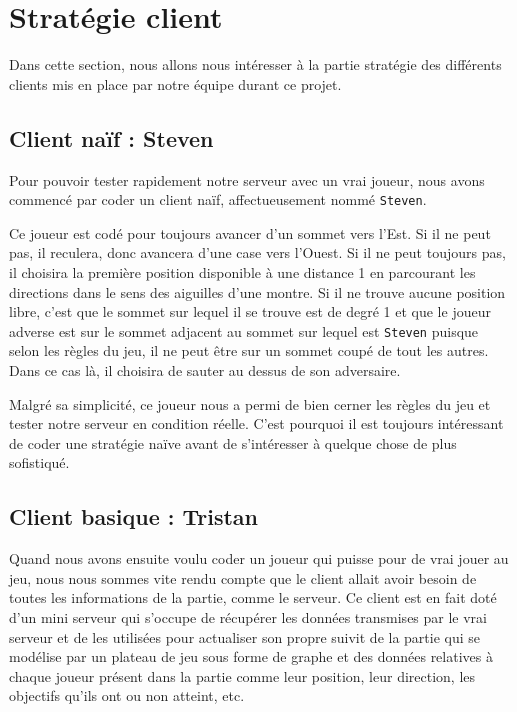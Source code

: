 \section{Stratégie client}

Dans cette section, nous allons nous intéresser à la partie stratégie des différents clients mis en place par notre équipe durant ce projet.

\subsection{Client naïf : Steven}

Pour pouvoir tester rapidement notre serveur avec un vrai joueur, nous avons commencé par coder un client naïf, affectueusement nommé \texttt{Steven}.
\bigskip

Ce joueur est codé pour toujours avancer d'un sommet vers l'Est. Si il ne peut pas, il reculera, donc avancera d'une case vers l'Ouest. Si il ne peut toujours pas, il choisira la première position disponible à une distance 1 en parcourant les directions dans le sens des aiguilles d'une montre. Si il ne trouve aucune position libre, c'est que le sommet sur lequel il se trouve est de degré 1 et que le joueur adverse est sur le sommet adjacent au sommet sur lequel est \texttt{Steven} puisque selon les règles du jeu, il ne peut être sur un sommet coupé de tout les autres. Dans ce cas là, il choisira de sauter au dessus de son adversaire.
\bigskip

Malgré sa simplicité, ce joueur nous a permi de bien cerner les règles du jeu et tester notre serveur en condition réelle. C'est pourquoi il est toujours intéressant de coder une stratégie naïve avant de s'intéresser à quelque chose de plus sofistiqué.

\subsection{Client basique : Tristan}

Quand nous avons ensuite voulu coder un joueur qui puisse pour de vrai jouer au jeu, nous nous sommes vite rendu compte que le client allait avoir besoin de toutes les informations de la partie, comme le serveur. Ce client est en fait doté d'un mini serveur qui s'occupe de récupérer les données transmises par le vrai serveur et de les utilisées pour actualiser son propre suivit de la partie qui se modélise par un plateau de jeu sous forme de graphe et des données relatives à chaque joueur présent dans la partie comme leur position, leur direction, les objectifs qu'ils ont ou non atteint, etc.
\bigskip

